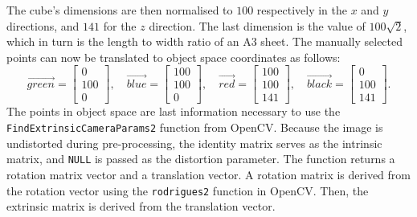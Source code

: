 The cube's dimensions are then normalised to $100$ respectively in the $x$ and
$y$ directions, and $141$ for the $z$ direction. The last dimension is the value
of $100\sqrt 2$, which in turn is the length to width ratio of an A3 sheet.
The manually selected points can now be translated to object space coordinates
as follows:
$$
\vec{green} = \left[ \begin{array}{ccc} 
0\\
100\\
0  \end{array} \right], \quad
\vec{blue} = \left[ \begin{array}{ccc} 
100\\
100\\
0  \end{array} \right], \quad
\vec{red} = \left[ \begin{array}{ccc} 
100\\
100\\
141  \end{array} \right], \quad
\vec{black} = \left[ \begin{array}{ccc} 
0\\
100\\
141  \end{array} \right].
$$
The points in object space are last information necessary to use the
\texttt{FindExtrinsic\-CameraParams2} function from OpenCV. Because the image is
undistorted during pre-processing, the identity matrix serves as the intrinsic
matrix, and \texttt{NULL} is passed as the distortion parameter. The function
returns a rotation matrix vector and a translation vector. A rotation matrix is
derived from the rotation vector using the \texttt{rodrigues2} function in
OpenCV. Then, the extrinsic matrix is derived from the translation vector. 

